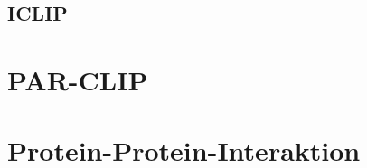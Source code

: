 \documentclass[12pt,a4paper]{article}
\begin{document}
\subsection{ICLIP}

\section{PAR-CLIP}

\section{Protein-Protein-Interaktion}



\newpage



\newpage



\newpage



\newpage


\end{document}
